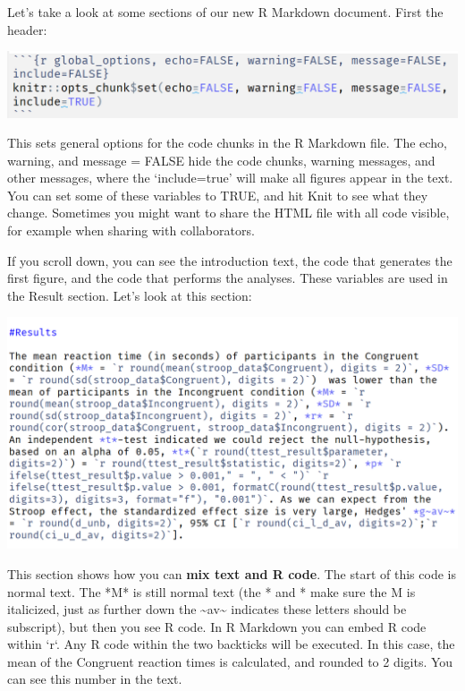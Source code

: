 \documentclass[
  oneside]{book}
\begin{document}
Let's take a look at some sections of our new R Markdown document. First the
header:

\begin{center}\includegraphics[width=1\linewidth]{images/5be3bc1c3f5a2ebf2d16d19430312057} \end{center}

This sets general options for the code chunks in the R Markdown file. The echo,
warning, and message = FALSE hide the code chunks, warning messages, and other
messages, where the `include=true' will make all figures appear in the text. You
can set some of these variables to TRUE, and hit Knit to see what they change.
Sometimes you might want to share the HTML file with all code visible, for
example when sharing with collaborators.

If you scroll down, you can see the introduction text, the code that generates
the first figure, and the code that performs the analyses. These variables are
used in the Result section. Let's look at this section:

\begin{center}\includegraphics[width=1\linewidth]{images/aab442e8c104cb1444a88b7a3a987de5} \end{center}

This section shows how you can \textbf{mix text and R code}. The start of this code
is normal text. The *M* is still normal text (the * and * make sure the M is italicized, just as further down the \textasciitilde av\textasciitilde{} indicates these letters should be subscript), but then you see R code. In R Markdown you can embed R code within `r`.
Any R code within the two backticks will be executed. In this case, the mean
of the Congruent reaction times is calculated, and rounded to 2 digits. You can
see this number in the text.
\end{document}
